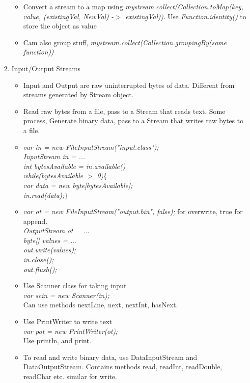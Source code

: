 \documentclass[a4paper]{article}
\begin{document}
\begin{enumerate}
\begin{itemize}
        \item Convert a stream to a map using \textit{mystream.collect(Collection.toMap(key, value, (existingVal, NewVal) -$>$ existingVal))}. Use \textit{Function.identity()} to store the object as value
        \item Cam also group stuff, \textit{mystream.collect(Collection.groupingBy(some function))}
    \end{itemize}
    \item Input/Output Streams
    \begin{itemize}
        \item Input and Output are raw uninterrupted bytes of data. Different from streams generated by Stream object.
        \item Read raw bytes from a file, pass to a Stream that reads text, Some process, Generate binary data, pass to a Stream that writes raw bytes to a file.
        \item \textit{var in = new FileInputStream("input.class");}\\
        \textit{InputStream in = ...}\\
        \textit{int bytesAvailable = in.available()}\\
        \textit{while(bytesAvailable $>$ 0)$\{$}\\
        \textit{var data = new byte[bytesAvailable];}\\
        \textit{in.read(data);$\}$}
        \item \textit{var ot = new FileInputStream("output.bin", false);} for overwrite, true for append.\\
        \textit{OutputStream ot = ...}\\
        \textit{byte[] values = ...}\\
        \textit{out.write(values);}\\
        \textit{in.close();}\\
        \textit{out.flush();}
        \item Use Scanner class for taking input\\
        \textit{var scin = new Scanner(in);}\\
        Can use methods nextLine, next, nextInt, hasNext.
        \item Use PrintWriter to write text\\
        \textit{var pot = new PrintWriter(ot);}\\
        Use println, and print.
        \item To read and write binary data, use DataInputStream and DataOutputStream. Contains methods read, readInt, readDouble, readChar etc. similar for write.

\end{itemize}
\end{enumerate}
\end{document}
